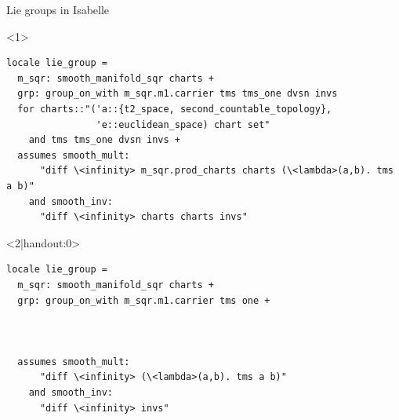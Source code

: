 \documentclass[12pt,notheorems,aspectratio=169,notes,handout]{beamer}
\begin{document}
\begin{frame}[fragile]{Lie groups in Isabelle}
\begin{onlyenv}<1>
\begin{lstlisting}
locale lie_group =
  m_sqr: smooth_manifold_sqr charts +
  grp: group_on_with m_sqr.m1.carrier tms tms_one dvsn invs
  for charts::"('a::{t2_space, second_countable_topology},
                'e::euclidean_space) chart set"
    and tms tms_one dvsn invs +
  assumes smooth_mult:
      "diff \<infinity> m_sqr.prod_charts charts (\<lambda>(a,b). tms a b)"
    and smooth_inv:
      "diff \<infinity> charts charts invs"
\end{lstlisting}
\end{onlyenv}
\begin{onlyenv}<2|handout:0>
\begin{lstlisting}
locale lie_group =
  m_sqr: smooth_manifold_sqr charts +
  grp: group_on_with m_sqr.m1.carrier tms one +



  assumes smooth_mult:
      "diff \<infinity> (\<lambda>(a,b). tms a b)"
    and smooth_inv:
      "diff \<infinity> invs"
\end{lstlisting}
\end{onlyenv}
\end{frame}
\end{document}
